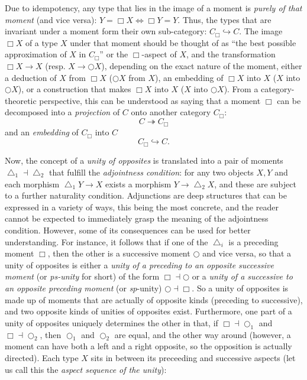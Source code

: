\documentclass{article}
\begin{document}
Due to idempotency, any type that lies in the image of a moment is \emph{purely of that moment} (and vice
versa): $Y=\Box X \Leftrightarrow \Box Y =Y$. Thus, the types that are invariant under a moment form their
own sub-category: $C_\Box\hookrightarrow C$. The image $\Box X $ of a type $X$ under that moment should
be thought of as ``the best possible approximation of $X$ in $C_\Box$'' or the $\Box$-aspect of $X$, and
the transformation $\Box X \rightarrow X$ (resp. $X\rightarrow \bigcirc X$), depending on the exact nature
of the moment, either a deduction of $X$ from $\Box  X $ ($\bigcirc X $ from $X$), an embedding of $\Box
X $ into $X$ ($X$ into 
$\bigcirc X$), or a construction that makes $\Box X$ into $X$ ($X$ into $\bigcirc X$). From a category-theoretic
perspective, this can be understood as saying that a moment $\Box$ can be decomposed into a \emph{projection}
of $C$ onto another category $C_\Box:$
$$C\twoheadrightarrow C_\Box$$
and an \emph{embedding} of $C_\Box$ into $C$ $$C_\Box\hookrightarrow C.$$

Now, the concept of a \emph{unity of opposites} is translated into a pair of moments $\bigtriangleup_1\dashv\bigtriangleup_2$
that fulfill the \emph{adjointness condition}: for any two objects $X,Y$ and each morphism $\bigtriangleup_1
Y\rightarrow X$ exists a morphism $Y\rightarrow \bigtriangleup_2 X$, and these are subject to a further
naturality condition. Adjunctions are deep structures that can be expressed in a variety of ways, this
being the most concrete, and the reader cannot be expected to immediately grasp the meaning of the adjointness
condition. However, some of its consequences can be used for better understanding. For instance, it follows
that if one of the $\bigtriangleup_i$ is a preceding moment $\Box$, then the other is a successive moment
$\bigcirc$ and vice versa, so that a unity of opposites is either a \emph{unity of a preceding to an opposite
successive moment} (or \emph{ps-unity} for  short) of the form $\Box\dashv\bigcirc$ or a \emph{unity of
a successive to an opposite preceding moment} (or \emph{sp}-unity) $\bigcirc\dashv\Box$. So a unity of
opposites is made up of moments that are actually of opposite kinds (preceding to successive), and two
opposite kinds of unities of opposites exist. Furthermore, one part of a unity of opposites uniquely determines
the other in that, if $\Box\dashv\bigcirc_1$ and $\Box\dashv\bigcirc_2$, then $\bigcirc_1$ and $\bigcirc_2$
are equal, and the other way around (however, a moment can have both a left and a right opposite, so the
opposition is actually directed). Each type $X$ sits in between its preceeding and successive aspects
(let us call this the \emph{aspect sequence of the unity}): 
\end{document}
